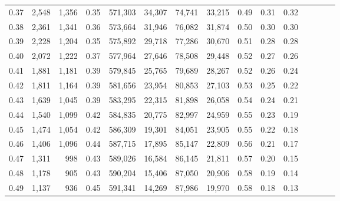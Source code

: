 \begin{tabular}{rrrcrrrrrrrrrrr}
0.37 &   2,548 &  1,356 &                                       0.35 &  571,303 &   34,307 &   74,741 &   33,215 &  0.49 &  0.31 &                         0.32 \\
0.38 &   2,361 &  1,341 &                                       0.36 &  573,664 &   31,946 &   76,082 &   31,874 &  0.50 &  0.30 &                         0.30 \\
0.39 &   2,228 &  1,204 &                                       0.35 &  575,892 &   29,718 &   77,286 &   30,670 &  0.51 &  0.28 &                         0.28 \\
0.40 &   2,072 &  1,222 &                                       0.37 &  577,964 &   27,646 &   78,508 &   29,448 &  0.52 &  0.27 &                         0.26 \\
0.41 &   1,881 &  1,181 &                                       0.39 &  579,845 &   25,765 &   79,689 &   28,267 &  0.52 &  0.26 &                         0.24 \\
0.42 &   1,811 &  1,164 &                                       0.39 &  581,656 &   23,954 &   80,853 &   27,103 &  0.53 &  0.25 &                         0.22 \\
0.43 &   1,639 &  1,045 &                                       0.39 &  583,295 &   22,315 &   81,898 &   26,058 &  0.54 &  0.24 &                         0.21 \\
0.44 &   1,540 &  1,099 &                                       0.42 &  584,835 &   20,775 &   82,997 &   24,959 &  0.55 &  0.23 &                         0.19 \\
0.45 &   1,474 &  1,054 &                                       0.42 &  586,309 &   19,301 &   84,051 &   23,905 &  0.55 &  0.22 &                         0.18 \\
0.46 &   1,406 &  1,096 &                                       0.44 &  587,715 &   17,895 &   85,147 &   22,809 &  0.56 &  0.21 &                         0.17 \\
0.47 &   1,311 &    998 &                                       0.43 &  589,026 &   16,584 &   86,145 &   21,811 &  0.57 &  0.20 &                         0.15 \\
0.48 &   1,178 &    905 &                                       0.43 &  590,204 &   15,406 &   87,050 &   20,906 &  0.58 &  0.19 &                         0.14 \\
0.49 &   1,137 &    936 &                                       0.45 &  591,341 &   14,269 &   87,986 &   19,970 &  0.58 &  0.18 &                         0.13 \\

\end{tabular}
